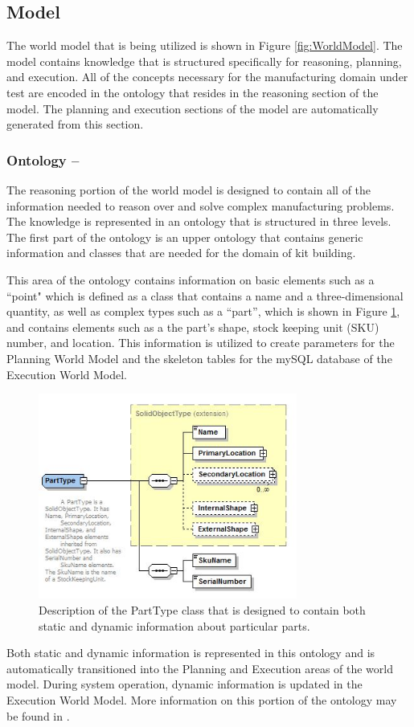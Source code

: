 \documentclass{llncs}
\begin{document}
\subsection{Model}
\label{subsection:Model}
The world model that is being utilized is shown in Figure \ref{fig:WorldModel}. The model contains knowledge that is structured specifically for
reasoning, planning, and execution. All of the concepts necessary for the manufacturing domain under test are
encoded in the ontology that resides in the reasoning section of the model. The planning and execution sections of the model are automatically generated from
this section.
\subsubsection{Ontology --}
The reasoning portion of the world model is designed to contain all of the information needed to reason over and solve complex manufacturing
problems. The knowledge is represented in an ontology that is structured in three levels. The first part of the ontology is an upper ontology
that contains generic information and classes that are needed for the domain of kit building. 

This area of the ontology contains information on basic elements such as a ``point" which is defined as a class that contains a name 
and a three-dimensional quantity, as well as complex types such as a ``part'', which is
shown in Figure \ref{fig:part}, and
contains elements such as a the part's shape, stock keeping unit (SKU) number, and location. This information is utilized to create parameters for the Planning World
Model and the skeleton tables for the mySQL database of the Execution World Model.
%
\begin{figure}[htb!]
\begin{center}
\includegraphics[width=8.5cm]{images/Part.jpg}
\caption{Description of the PartType class that is designed to contain both static and dynamic information about particular parts.}
\label{fig:part}
\end{center}
\end{figure}
%
Both static and dynamic information is represented in this
ontology and is automatically transitioned into the Planning and Execution areas of the world model. During system
operation,  dynamic information is updated in the Execution World Model.
More information on this portion of the ontology may be found in \cite{Balakirsky2012-1}.
\end{document}
